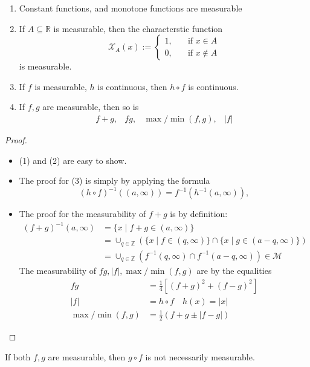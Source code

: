 \begin{proposition}
\begin{enumerate}
\item
Constant functions, 
and monotone functions are measurable
\item
If $A\subseteq\mathbb{R}$ is measurable, 
then the characterstic function
\[
\mathcal{X}_A(x):=\left\{
\begin{aligned}
1,&\quad\text{if $x\in A$}\\
0,&\quad\text{if $x\notin A$}
\end{aligned}
\right.
\]
is measurable.
\item
If $f$ is measurable, $h$ is continuous, then $h\circ f$ is continuous.
\item
If $f,g$ are measurable, then so is 
\[
\begin{array}{llll}
f+g,&fg,&\max/\min(f,g),&|f|
\end{array}
\]
\end{enumerate}
\end{proposition}
\begin{proof}
\begin{itemize}
\item
(1) and (2) are easy to show.
\item
The proof for (3) is simply by applying the formula
\[
(h\circ f)^{-1}((a,\infty)) = f^{-1}(h^{-1}(a,\infty)),
\]
\item
The proof for the measurability of $f+g$ is by definition:
\begin{align*}
(f+g)^{-1}(a,\infty) &= \{x\mid f+g\in(a,\infty)\}\\
&=
\cup_{q\in\mathbb{Z}}(\{x\mid f\in (q,\infty)\}\cap\{x\mid g\in(a-q,\infty)\})\\
&=\cup_{q\in\mathbb{Z}}(f^{-1}(q,\infty)\cap f^{-1}(a-q,\infty))\in\mathcal{M}
\end{align*}
The measurability of $fg,|f|,\max/\min(f,g)$ are by the equalities
\begin{align*}
fg&=\frac{1}{4}[(f+g)^2+(f-g)^2]\\
|f|&=h\circ f\quad h(x)=|x|\\
\max/\min(f,g)&=\frac{1}{2}(f+g\pm|f-g|)
\end{align*}
\end{itemize}
\end{proof}


\begin{remark}
If both $f,g$ are measurable, then $g\circ f$ is not necessarily measurable.
\end{remark}


